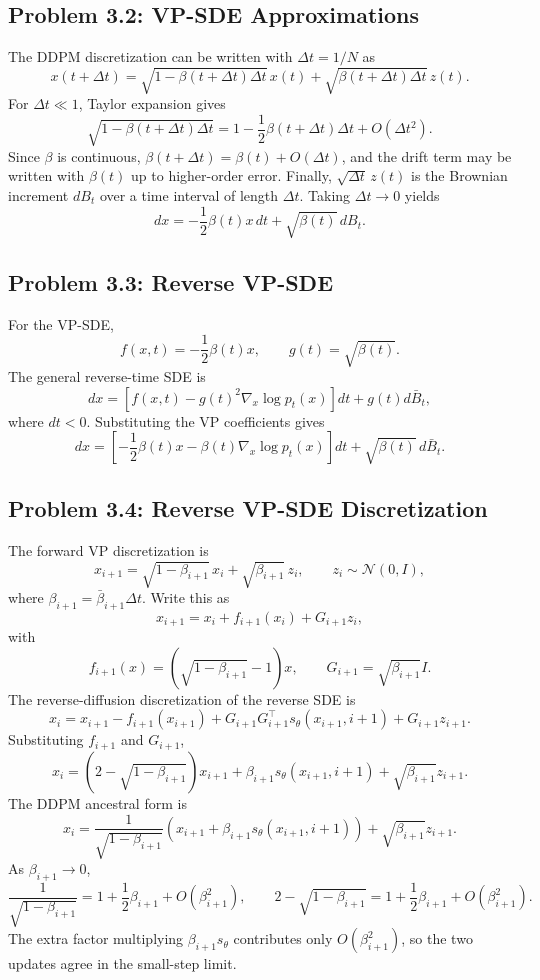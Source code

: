 \documentclass[11pt]{article}
\newcommand{\N}{\mathcal{N}}
\newcommand{\Id}{I}
\begin{document}
\subsection*{Problem 3.2: VP-SDE Approximations}
The DDPM discretization can be written with $\Delta t=1/N$ as
\[
x(t+\Delta t)=\sqrt{1-\beta(t+\Delta t)\Delta t}\,x(t)
+\sqrt{\beta(t+\Delta t)\Delta t}\,z(t).
\]
For $\Delta t\ll 1$, Taylor expansion gives
\[
\sqrt{1-\beta(t+\Delta t)\Delta t}
=1-\frac12\beta(t+\Delta t)\Delta t+O(\Delta t^2).
\]
Since $\beta$ is continuous, $\beta(t+\Delta t)=\beta(t)+O(\Delta t)$, and the drift term may be written with $\beta(t)$ up to higher-order error.  Finally, $\sqrt{\Delta t}\,z(t)$ is the Brownian increment $dB_t$ over a time interval of length $\Delta t$.  Taking $\Delta t\to 0$ yields
\[
dx=-\frac12\beta(t)x\,dt+\sqrt{\beta(t)}\,dB_t.
\]

\subsection*{Problem 3.3: Reverse VP-SDE}
For the VP-SDE,
\[
f(x,t)=-\frac12\beta(t)x,\qquad g(t)=\sqrt{\beta(t)}.
\]
The general reverse-time SDE is
\[
dx=\left[f(x,t)-g(t)^2\nabla_x\log p_t(x)\right]dt+g(t)d\bar B_t,
\]
where $dt<0$.  Substituting the VP coefficients gives
\[
dx=\left[-\frac12\beta(t)x-\beta(t)\nabla_x\log p_t(x)\right]dt
+\sqrt{\beta(t)}\,d\bar B_t.
\]

\subsection*{Problem 3.4: Reverse VP-SDE Discretization}
The forward VP discretization is
\[
x_{i+1}=\sqrt{1-\beta_{i+1}}\,x_i+\sqrt{\beta_{i+1}}\,z_i,
\qquad z_i\sim\N(0,\Id),
\]
where $\beta_{i+1}=\bar\beta_{i+1}\Delta t$.  Write this as
\[
x_{i+1}=x_i+f_{i+1}(x_i)+G_{i+1}z_i,
\]
with
\[
f_{i+1}(x)=\left(\sqrt{1-\beta_{i+1}}-1\right)x,
\qquad
G_{i+1}=\sqrt{\beta_{i+1}}\Id.
\]
The reverse-diffusion discretization of the reverse SDE is
\[
x_i=x_{i+1}-f_{i+1}(x_{i+1})
+G_{i+1}G_{i+1}^{\top}s_\theta(x_{i+1},i+1)
+G_{i+1}z_{i+1}.
\]
Substituting $f_{i+1}$ and $G_{i+1}$,
\[
x_i=(2-\sqrt{1-\beta_{i+1}})x_{i+1}
+\beta_{i+1}s_\theta(x_{i+1},i+1)
+\sqrt{\beta_{i+1}}z_{i+1}.
\]
The DDPM ancestral form is
\[
x_i=
\frac{1}{\sqrt{1-\beta_{i+1}}}
\left(x_{i+1}+\beta_{i+1}s_\theta(x_{i+1},i+1)\right)
+\sqrt{\beta_{i+1}}z_{i+1}.
\]
As $\beta_{i+1}\to 0$,
\[
\frac{1}{\sqrt{1-\beta_{i+1}}}=1+\frac12\beta_{i+1}+O(\beta_{i+1}^2),
\qquad
2-\sqrt{1-\beta_{i+1}}=1+\frac12\beta_{i+1}+O(\beta_{i+1}^2).
\]
The extra factor multiplying $\beta_{i+1}s_\theta$ contributes only $O(\beta_{i+1}^2)$, so the two updates agree in the small-step limit.
\end{document}

